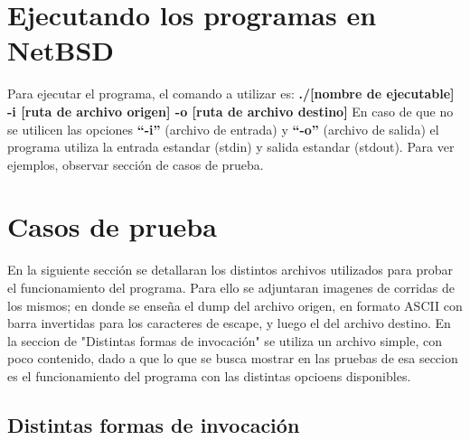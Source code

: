 \documentclass[a4paper,10pt]{article}
\begin{document}
\section{Ejecutando los programas en NetBSD}
  Para ejecutar el programa, el comando a utilizar es:
  \newline
  {\bf./[nombre de ejecutable] -i [ruta de archivo origen] -o [ruta de archivo destino]}
  \newline
  En caso de que no se utilicen las opciones {\bf ``-i''} (archivo de entrada) y {\bf ``-o''} (archivo de salida) el 
  programa utiliza la entrada estandar (stdin) y salida estandar (stdout). Para ver ejemplos, observar 
  secci\'on de casos de prueba.


\section{Casos de prueba}
En la siguiente secci\'on se detallaran los distintos archivos utilizados para probar el funcionamiento del
programa. Para ello se adjuntaran imagenes de corridas de los mismos; en donde se ense\~{n}a el dump del 
archivo origen, en formato ASCII con barra invertidas para los caracteres de escape, y luego el del 
archivo destino.
En la seccion de "Distintas formas de invocaci\'on" se utiliza un archivo simple, con poco contenido, dado a que lo que se busca
mostrar en las pruebas de esa seccion es el funcionamiento del programa con las distintas opcioens disponibles.

  \subsection{Distintas formas de invocaci\'on}
\end{document}
